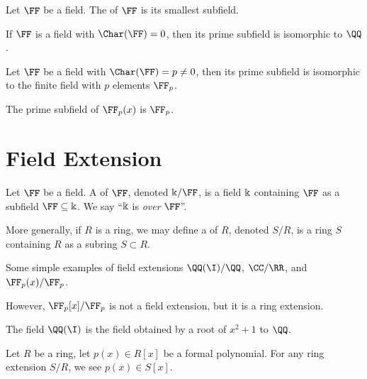 \begin{definition}
Let $\FF$ be a field. The  of $\FF$ is its
smallest subfield.
\end{definition}

\begin{proposition}
If $\FF$ is a field with $\Char(\FF)=0$, then its prime subfield is
isomorphic to $\QQ$.
\end{proposition}

\begin{proposition}
Let $\FF$ be a field with $\Char(\FF)=p\neq0$, then its prime subfield
is isomorphic to the finite field with $p$ elements $\FF_{p}$.
\end{proposition}

\begin{example}
The prime subfield of $\FF_{p}(x)$ is $\FF_{p}$.
\end{example}

\section{Field Extension}

\begin{definition}
Let $\FF$ be a field. A  of $\FF$, denoted
$\kk/\FF$, is a field $\Bbbk$ containing $\FF$ as a subfield $\FF\subset\kk$.
We say ``$\Bbbk$ is \emph{over} $\FF$''.

More generally, if $R$ is a ring, we may define a 
of $R$, denoted $S/R$, is a ring $S$ containing $R$ as a subring
$S\subset R$.
\end{definition}

\begin{example}
Some simple examples of field extensions $\QQ(\I)/\QQ$, $\CC/\RR$, and
$\FF_{p}(x)/\FF_{p}$.

However, $\FF_{p}[x]/\FF_{p}$ is not a field extension, but it is a
ring extension.
\end{example}

\begin{example}
The field $\QQ(\I)$ is the field obtained by  a root
of $x^{2}+1$ to $\QQ$.
\end{example}

\begin{proposition}
Let $R$ be a ring, let $p(x)\in R[x]$ be a formal polynomial. For any
ring extension $S/R$, we see $p(x)\in S[x]$.
\end{proposition}

